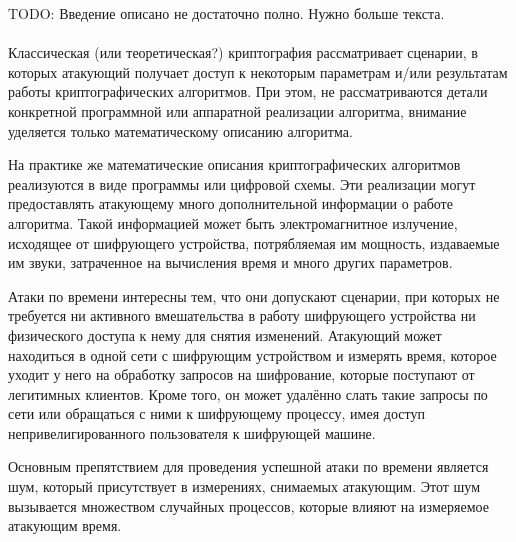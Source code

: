 
TODO: Введение описано не достаточно полно. Нужно больше текста. \\
\\

Классическая (или теоретическая?) криптография рассматривает сценарии, в
которых атакующий получает доступ к некоторым параметрам и/или результатам
работы криптографических алгоритмов. При этом, не рассматриваются детали
конкретной программной или аппаратной реализации алгоритма, внимание уделяется
только математическому описанию алгоритма.

На практике же математические описания криптографических алгоритмов реализуются
в виде программы или цифровой схемы. Эти реализации могут предоставлять атакующему
много дополнительной информации о работе алгоритма. Такой информацией может быть
электромагнитное излучение, исходящее от шифрующего устройства, потрябляемая им
мощность, издаваемые им звуки, затраченное на вычисления время и много других
параметров.

Атаки по времени интересны тем, что они допускают сценарии, при которых не
требуется ни активного вмешательства в
работу шифрующего устройства ни физического доступа к нему для снятия изменений.
Атакующий может находиться в одной сети с шифрующим устройством и измерять
время, которое уходит у него на обработку запросов на шифрование, которые
поступают от легитимных клиентов. Кроме того, он может удалённо слать такие
запросы по сети или обращаться с ними к шифрующему процессу, имея доступ
непривелигированного пользователя к шифрующей машине.

Основным препятствием для проведения успешной атаки по времени является шум,
который присутствует в измерениях, снимаемых атакующим. Этот шум вызывается
множеством случайных процессов, которые влияют на измеряемое атакующим время.

\clearpage
